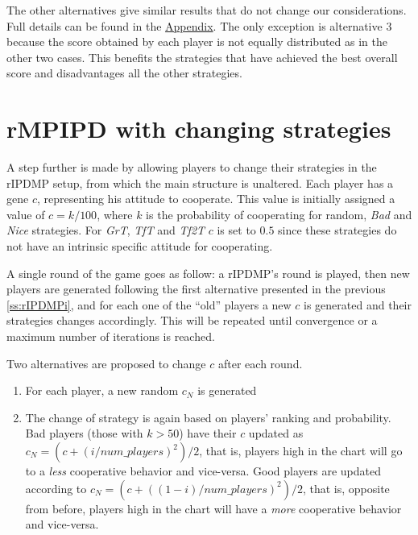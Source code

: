 \documentclass[journal,10pt,twoside]{IEEEtran}
\begin{document}
The other alternatives give similar results that do not change our considerations. Full details can be found in the \hyperref[s:appendix]{Appendix}. The only exception is alternative $3$ because the score obtained by each player is not equally distributed as in the other two cases. This benefits the strategies that have achieved the best overall score and disadvantages all the other strategies.
\section{rMPIPD with changing strategies} \label{s:crIPDMP}
A step further is made by allowing players to change their strategies in the rIPDMP setup, from which the main structure is unaltered.
Each player has a gene $c$, representing his attitude to cooperate. This value is initially assigned a value of $c=k/100$, where $k$ is the probability of cooperating for random, \textit{Bad} and \textit{Nice} strategies. For \textit{GrT}, \textit{TfT} and \textit{Tf2T} $c$ is set to $0.5$ since these strategies do not have an intrinsic specific attitude for cooperating.
 
A single round of the game goes as follow: a rIPDMP's round is played, then new players are generated following the first alternative presented in the previous \autoref{ss:rIPDMPi}, and for each one of the ``old'' players a new $c$ is generated and their strategies changes accordingly. This will be repeated until convergence or a maximum number of iterations is reached.

Two alternatives are proposed to change $c$ after each round.
\begin{enumerate}
    \item For each player, a new random $c_N$ is generated
    \item The change of strategy is again based on players' ranking and probability. Bad players (those with $k>50$) have their $c$ updated as
    $c_N = (c+(i/num\_players)^2)/2$, that is, players high in the chart will go to a \textit{less} cooperative behavior and vice-versa.
    Good players are updated according to $c_N = (c+((1-i)/num\_players)^2)/2$, that is, opposite from before, players high in the chart will have a \textit{more} cooperative behavior and vice-versa.
\end{enumerate}
\end{document}
